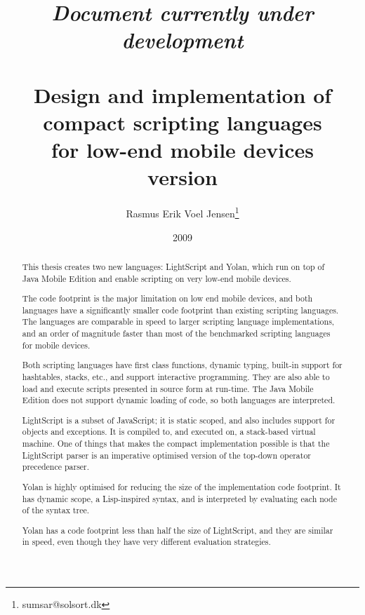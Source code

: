 \documentclass[11pt]{report}
\title{
\emph{Document currently under development} \\ ~ \\
Design and implementation of \\
compact scripting languages \\ 
for low-end mobile devices \\
{\scriptsize version }}
\author{
  Rasmus Erik Voel Jensen\footnote{
    sumsar@solsort.dk
  }
}
\date{2009}
\begin{document}
\maketitle
\begin{abstract}
This thesis creates two new languages: LightScript and Yolan, which run on top of Java Mobile Edition and enable scripting on very low-end mobile devices.

The code footprint is the major limitation on low end mobile devices, and both languages have a significantly smaller code footprint than existing scripting languages. 
The languages are comparable in speed to larger scripting language implementations,
and an order of magnitude faster than most of the benchmarked scripting languages for mobile devices.

Both scripting languages have first class functions, dynamic typing, built-in support for hashtables, stacks, etc., and support interactive programming. They are also able to load and execute scripts presented in source form at run-time. 
The Java Mobile Edition does not support dynamic loading of code, so both languages are interpreted.

LightScript is a subset of JavaScript; it is static scoped, and also includes support for objects and exceptions. It is compiled to, and executed on, a stack-based virtual machine. One of things that makes the compact implementation possible is that the LightScript parser is an imperative optimised version of the top-down operator precedence parser.

Yolan is highly optimised for reducing the size of the implementation code footprint. It has dynamic scope, a Lisp-inspired syntax, and is interpreted by evaluating each node of the syntax tree.

Yolan has a code footprint less than half the size of LightScript, and they are similar in speed, even though they have very different evaluation strategies.
\end{abstract}

\setcounter{tocdepth}{1}
\tableofcontents
\end{document}
